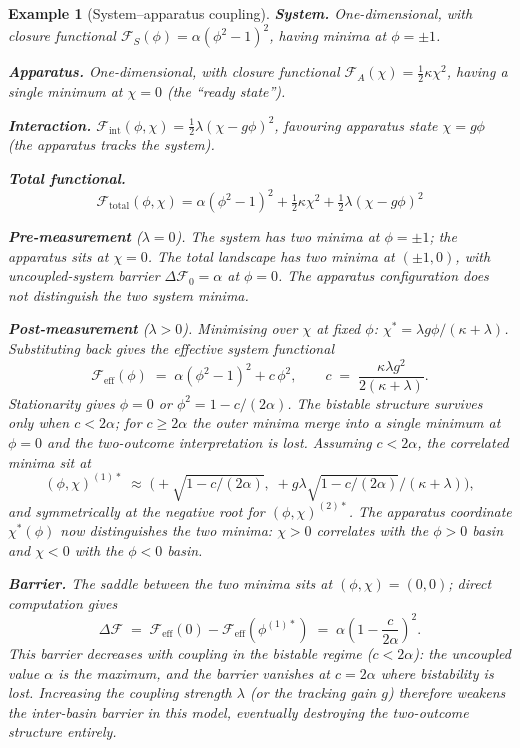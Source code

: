 \documentclass[12pt]{article}
\newtheorem{example}[theorem]{Example}
\newcommand{\Fcal}{\mathcal{F}}
\begin{document}
\begin{example}[System--apparatus coupling]\label{ex:toy}
\textbf{System.} One-dimensional, with closure functional $\Fcal_S(\phi) = \alpha(\phi^2 - 1)^2$, having minima at $\phi = \pm 1$.

\textbf{Apparatus.} One-dimensional, with closure functional $\Fcal_A(\chi) = \tfrac{1}{2}\kappa \chi^2$, having a single minimum at $\chi = 0$ (the ``ready state'').

\textbf{Interaction.} $\Fcal_{\mathrm{int}}(\phi, \chi) = \tfrac{1}{2}\lambda(\chi - g\phi)^2$, favouring apparatus state $\chi = g\phi$ (the apparatus tracks the system).

\textbf{Total functional.}
\begin{equation}
    \Fcal_{\mathrm{total}}(\phi, \chi) = \alpha(\phi^2 - 1)^2 + \tfrac{1}{2}\kappa \chi^2 + \tfrac{1}{2}\lambda(\chi - g\phi)^2
\end{equation}

\textbf{Pre-measurement} ($\lambda = 0$). The system has two minima at $\phi = \pm 1$; the apparatus sits at $\chi = 0$. The total landscape has two minima at $(\pm 1, 0)$, with uncoupled-system barrier $\Delta\Fcal_0 = \alpha$ at $\phi = 0$. The apparatus configuration does not distinguish the two system minima.

\textbf{Post-measurement} ($\lambda > 0$). Minimising over $\chi$ at fixed $\phi$: $\chi^* = \lambda g\phi / (\kappa + \lambda)$. Substituting back gives the effective system functional
\begin{equation}
    \Fcal_{\mathrm{eff}}(\phi) \;=\; \alpha(\phi^2 - 1)^2 + c\,\phi^2, \qquad c \;=\; \frac{\kappa\lambda g^2}{2(\kappa + \lambda)}.
\end{equation}
Stationarity gives $\phi = 0$ or $\phi^2 = 1 - c/(2\alpha)$. The bistable structure \emph{survives only when $c < 2\alpha$}; for $c \geq 2\alpha$ the outer minima merge into a single minimum at $\phi = 0$ and the two-outcome interpretation is lost. Assuming $c < 2\alpha$, the correlated minima sit at
\begin{equation}
    (\phi, \chi)^{(1)*} \;\approx\; \bigl(+\sqrt{1 - c/(2\alpha)},\; +g\lambda\sqrt{1 - c/(2\alpha)}/(\kappa+\lambda)\bigr),
\end{equation}
and symmetrically at the negative root for $(\phi,\chi)^{(2)*}$. The apparatus coordinate $\chi^*(\phi)$ now distinguishes the two minima: $\chi > 0$ correlates with the $\phi > 0$ basin and $\chi < 0$ with the $\phi < 0$ basin.

\textbf{Barrier.} The saddle between the two minima sits at $(\phi, \chi) = (0, 0)$; direct computation gives
\begin{equation}
    \Delta\Fcal \;=\; \Fcal_{\mathrm{eff}}(0) - \Fcal_{\mathrm{eff}}(\phi^{(1)*}) \;=\; \alpha\left(1 - \frac{c}{2\alpha}\right)^2.
\end{equation}
This barrier \emph{decreases} with coupling in the bistable regime ($c < 2\alpha$): the uncoupled value $\alpha$ is the maximum, and the barrier vanishes at $c = 2\alpha$ where bistability is lost. Increasing the coupling strength $\lambda$ (or the tracking gain $g$) therefore \emph{weakens} the inter-basin barrier in this model, eventually destroying the two-outcome structure entirely.


\end{example}
\end{document}
